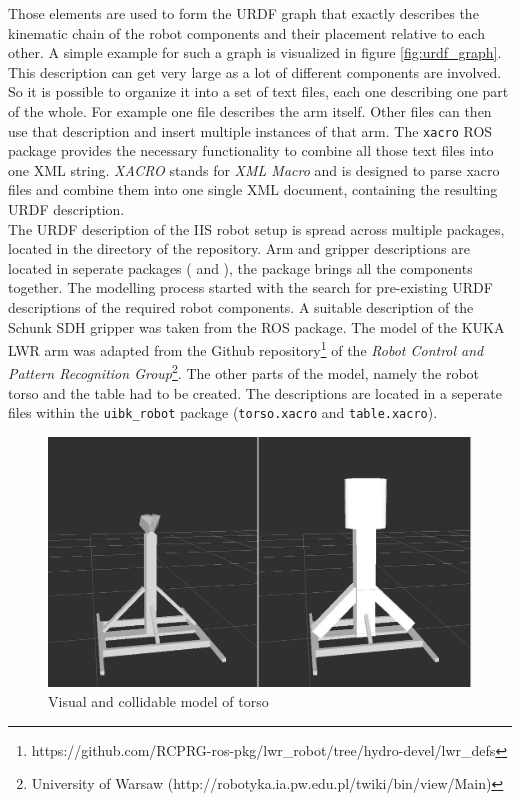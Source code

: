 Those elements are used to form the URDF graph that exactly describes the kinematic chain of the robot components and their placement relative to each other. A simple example for such a graph is visualized in figure \ref{fig:urdf_graph}. This description can get very large as a lot of different components are involved. So it is possible to organize it into a set of text files, each one describing one part of the whole. For example one file describes the arm itself. Other files can then use that description and insert multiple instances of that arm. The \texttt{xacro} ROS package provides the necessary functionality to combine all those text files into one XML string. \emph{XACRO} stands for \emph{XML Macro} and is designed to parse xacro files and combine them into one single XML document, containing the resulting URDF description.\\

The URDF description of the IIS robot setup is spread across multiple packages, located in the  directory of the  repository. Arm and gripper descriptions are located in seperate packages ( and ), the  package brings all the components together. The modelling process started with the search for pre-existing URDF descriptions of the required robot components. A suitable description of the Schunk SDH gripper was taken from the  ROS package. The model of the KUKA LWR arm was adapted from the Github repository\footnote{https://github.com/RCPRG-ros-pkg/lwr\_robot/tree/hydro-devel/lwr\_defs} of the \emph{Robot Control and Pattern Recognition Group}\footnote{University of Warsaw (http://robotyka.ia.pw.edu.pl/twiki/bin/view/Main)}. The other parts of the model, namely the robot torso and the table had to be created. The descriptions are located in a seperate files within the \texttt{uibk\_robot} package (\texttt{torso.xacro} and \texttt{table.xacro}). \\

\begin{figure}[h]
	\centering
  	\includegraphics[width=1.0\textwidth]{images/torso.jpg}
	\caption{Visual and collidable model of torso}
	\label{fig:torso_col}
\end{figure}

